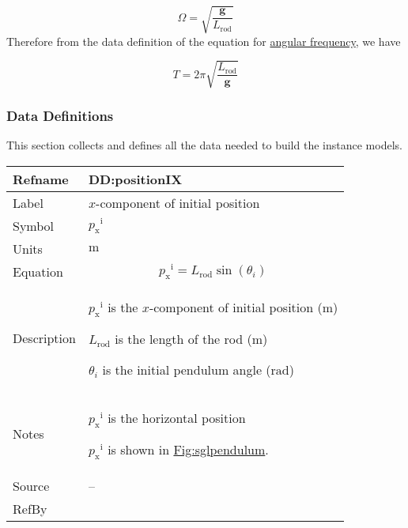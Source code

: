 \documentclass[12pt]{article}
\begin{document}
\begin{displaymath}
Ω=\sqrt{\frac{\symbf{g}}{{L_{\text{rod}}}}}
\end{displaymath}
Therefore from the data definition of the equation for \hyperref[DD:angFrequencyDD]{angular frequency}, we have

\begin{displaymath}
T=2 π \sqrt{\frac{{L_{\text{rod}}}}{\symbf{g}}}
\end{displaymath}
\subsubsection{Data Definitions}
\label{Sec:DDs}
This section collects and defines all the data needed to build the instance models.

\vspace{\baselineskip}
\noindent
\begin{minipage}{\textwidth}
\begin{tabular}{>{\raggedright}p{}>{\raggedright\arraybackslash}p{}}
\toprule \textbf{Refname} & \textbf{DD:positionIX}
\label{DD:positionIX}
\\ \midrule
Label & $x$-component of initial position
        
\\ \midrule
Symbol & ${{p_{\text{x}}}^{\text{i}}}$
         
\\ \midrule
Units & ${\text{m}}$
        
\\ \midrule
Equation & \begin{displaymath}
           {{p_{\text{x}}}^{\text{i}}}={L_{\text{rod}}} \sin\left({θ_{i}}\right)
           \end{displaymath}
\\ \midrule
Description & \begin{symbDescription}
              \item{${{p_{\text{x}}}^{\text{i}}}$ is the $x$-component of initial position (${\text{m}}$)}
              \item{${L_{\text{rod}}}$ is the length of the rod (${\text{m}}$)}
              \item{${θ_{i}}$ is the initial pendulum angle (${\text{rad}}$)}
              \end{symbDescription}
\\ \midrule
Notes & ${{p_{\text{x}}}^{\text{i}}}$ is the horizontal position
        
        ${{p_{\text{x}}}^{\text{i}}}$ is shown in \hyperref[Figure:sglpendulum]{Fig:sglpendulum}.
        
\\ \midrule
Source & --
         
\\ \midrule
RefBy & 
\\ \bottomrule
\end{tabular}
\end{minipage}
\end{document}
